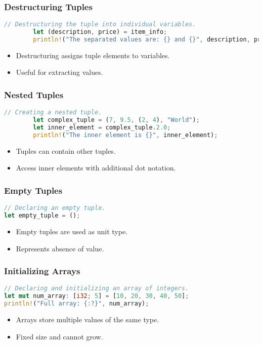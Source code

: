 \documentclass[aspectratio=169, table]{beamer}
\begin{document}
\begin{frame}[fragile]
	\frametitle{Destructuring Tuples}
	\begin{lstlisting}[language=Rust]
		// Destructuring the tuple into individual variables.
		let (description, price) = item_info;
		println!("The separated values are: {} and {}", description, price); 
	\end{lstlisting}
	\begin{itemize}
		\item Destructuring assigns tuple elements to variables.
		\item Useful for extracting values.
	\end{itemize}
\end{frame}

\begin{frame}[fragile]
	\frametitle{Nested Tuples}
	\begin{lstlisting}[language=Rust]
		// Creating a nested tuple.
		let complex_tuple = (7, 9.5, (2, 4), "World");
		let inner_element = complex_tuple.2.0;
		println!("The inner element is {}", inner_element); 
	\end{lstlisting}
	\begin{itemize}
		\item Tuples can contain other tuples.
		\item Access inner elements with additional dot notation.
	\end{itemize}
\end{frame}

\begin{frame}[fragile]
	\frametitle{Empty Tuples}
\begin{lstlisting}[language=Rust]
// Declaring an empty tuple.
let empty_tuple = ();
\end{lstlisting}
\begin{itemize}
	\item Empty tuples are used as unit type.
	\item Represents absence of value.
\end{itemize}
\end{frame}

\begin{frame}[fragile]
\frametitle{Initializing Arrays}
\begin{lstlisting}[language=Rust]
// Declaring and initializing an array of integers.
let mut num_array: [i32; 5] = [10, 20, 30, 40, 50];  
println!("Full array: {:?}", num_array);
\end{lstlisting}
\begin{itemize}
\item Arrays store multiple values of the same type.
\item Fixed size and cannot grow.
\end{itemize}
\end{frame}
\end{document}
